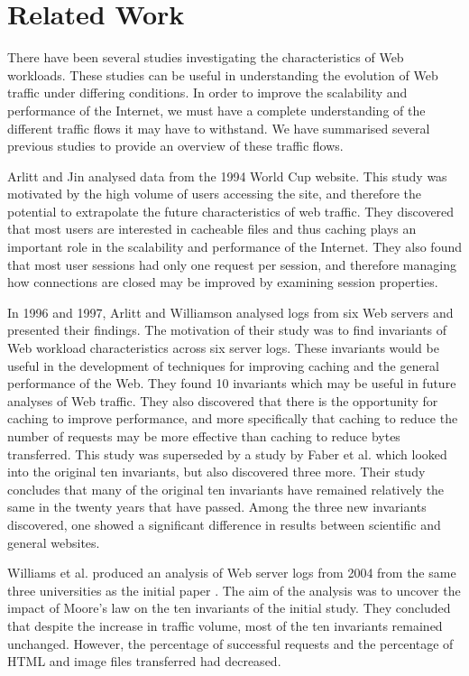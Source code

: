 \documentclass[10pt,conference]{IEEEtran}
\begin{document}
\section{Related Work}\label{related_work}
There have been several studies investigating the characteristics of Web workloads. These studies can be useful in understanding the evolution of Web traffic under differing conditions. In order to improve the scalability and performance of the Internet, we must have a complete understanding of the different traffic flows it may have to withstand. We have summarised several previous studies to provide an overview of these traffic flows. 

Arlitt and Jin \cite{world_cup} analysed data from the 1994 World Cup website. This study was motivated by the high volume of users accessing the site, and therefore the potential to extrapolate the future characteristics of web traffic. They discovered that most users are interested in cacheable files and thus caching plays an important role in the scalability and performance of the Internet. They also found that most user sessions had only one request per session, and therefore managing how connections are closed may be improved by examining session properties.

In 1996 and 1997, Arlitt and Williamson \cite{keynote, invariants} analysed logs from six Web servers and presented their findings. The motivation of their study was to find invariants of Web workload characteristics across six server logs. These invariants would be useful in the development of techniques for improving caching and the general performance of the Web. They found 10 invariants which may be useful in future analyses of Web traffic. They also discovered that there is the opportunity for caching to improve performance, and more specifically that caching to reduce the number of requests may be more effective than caching to reduce bytes transferred. 
This study was superseded by a study by Faber et al. \cite{Faber} which looked into the original ten invariants, but also discovered three more. Their study concludes that many of the original ten invariants have remained relatively the same in the twenty years that have passed. Among the three new invariants discovered, one showed a significant difference in results between scientific and general websites.

Williams et al. \cite{williams05} produced an analysis of Web server logs from 2004 from the same three universities as the initial paper \cite{keynote}. The aim of the analysis was to uncover the impact of Moore's law on the ten invariants of the initial study. They concluded that despite the increase in traffic volume, most of the ten invariants remained unchanged. However, the percentage of successful requests and the percentage of HTML and image files transferred had decreased. 
\end{document}
